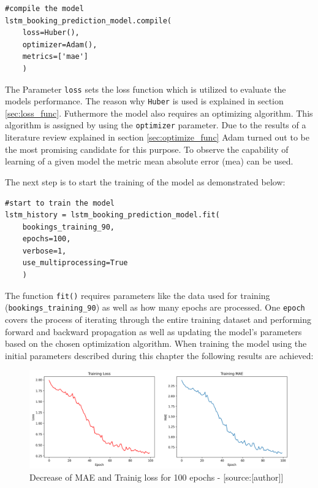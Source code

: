 \begin{lstlisting}
#compile the model 
lstm_booking_prediction_model.compile(
    loss=Huber(),
    optimizer=Adam(),
    metrics=['mae']
	)
\end{lstlisting}
The Parameter \verb|loss| sets the loss function which is utilized to evaluate the models performance. The reason why \verb|Huber| is used is explained in section \ref{sec:loss_func}. Futhermore the model also requires an optimizing algorithm. This algorithm is assigned by using the \verb|optimizer| parameter. Due to the results of a literature review explained in section \ref{sec:optimize_func} Adam turned out to be the most promising candidate for this purpose. To observe the capability of learning of a given model the metric mean absolute error (mea) can be used. 

The next step is to start the training of the model as demonstrated below:
\begin{lstlisting}
#start to train the model
lstm_history = lstm_booking_prediction_model.fit(
    bookings_training_90,
    epochs=100,
    verbose=1,
    use_multiprocessing=True
	)
\end{lstlisting}
The function \verb|fit()| requires parameters like the data used for training (\verb|bookings_training_90|) as well as how many epochs are processed. One \verb|epoch| covers the process of iterating through the entire training dataset and performing forward and backward propagation as well as updating the model's parameters based on the chosen optimization algorithm.
\newline
When training the model using the initial parameters described during this chapter the following results are achieved:
\begin{figure}[H]
	\centering
		\includegraphics[width=14cm]{images/lstm_1st_lr_mae}
	\caption{Decrease of MAE and Trainig loss for 100 epochs - [source:[author]]}
	\label{fig:training_test}
\end{figure}
